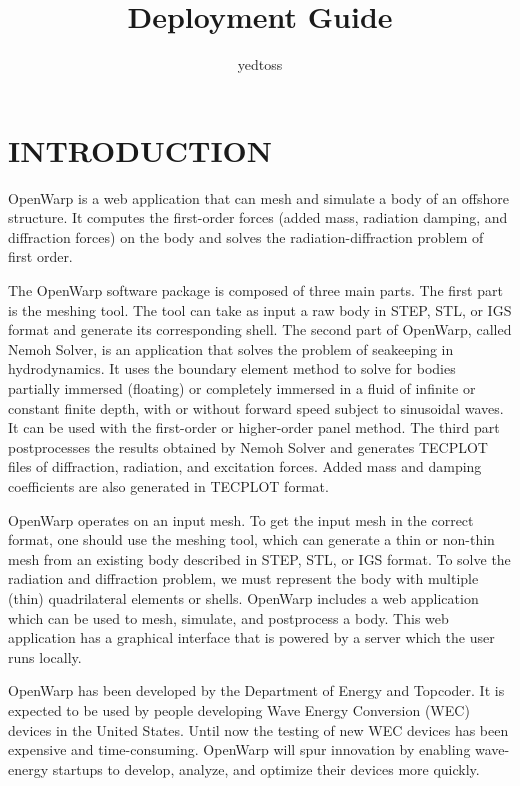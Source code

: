 \documentclass[12pt]{article}
\title{Deployment Guide}
\author{yedtoss}
\begin{document}
\sloppy

\maketitle
\thispagestyle{empty}
\tableofcontents
\newpage

\section{INTRODUCTION}
OpenWarp is a web application that can mesh and simulate a body of an offshore structure.
It computes the first-order forces (added mass, radiation damping, and diffraction forces) on the body and solves the radiation-diffraction problem of first order.

The OpenWarp software package is composed of three main parts. The first part is the meshing tool. The tool can take as input a raw body in STEP, STL, or IGS format and generate its corresponding shell.
The second part of OpenWarp, called Nemoh Solver, is an application that solves the problem of seakeeping in hydrodynamics. It uses the boundary element method to solve for bodies partially immersed (floating) or completely immersed in a fluid of infinite or constant finite depth, with or without forward speed subject to sinusoidal waves. It can be used with the first-order or higher-order panel method.
The third part postprocesses the results obtained by Nemoh Solver and generates TECPLOT files of diffraction, radiation, and excitation forces. Added mass and damping coefficients are also generated in TECPLOT format.

OpenWarp operates on an input mesh. To get the input mesh in the correct format, one should use the meshing tool, which can generate a thin or non-thin mesh from an existing body described in STEP, STL, or IGS format. To solve the radiation and diffraction problem, we must represent the body with multiple (thin) quadrilateral elements or shells.
OpenWarp includes a web application which can be used to mesh, simulate, and postprocess a body. This web application has a graphical interface that is powered by a server which the user runs locally.

OpenWarp has been developed by the Department of Energy and Topcoder. It is expected to be used by people developing Wave Energy Conversion (WEC) devices in the United States. Until now the testing of new WEC devices has been expensive and time-consuming. OpenWarp will spur innovation by enabling wave-energy startups to develop, analyze, and optimize their devices more quickly.
\end{document}

